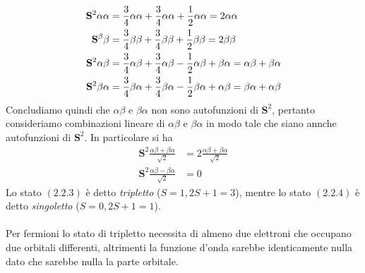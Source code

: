 \documentclass{article}
\begin{document}
\begin{align}
    \mathbf{S}^2\alpha\alpha &= \frac{3}{4}\alpha\alpha + \frac{3}{4}\alpha\alpha + \frac{1}{2}\alpha\alpha = 2\alpha\alpha \notag \\
    \mathbf{S}^\beta\beta &= \frac{3}{4}\beta\beta + \frac{3}{4}\beta\beta + \frac{1}{2}\beta\beta = 2\beta\beta \notag \\
    \mathbf{S}^2\alpha\beta &= \frac{3}{4}\alpha\beta + \frac{3}{4}\alpha\beta - \frac{1}{2}\alpha\beta + \beta\alpha = \alpha\beta + \beta\alpha \notag \\
    \mathbf{S}^2\beta\alpha &= \frac{3}{4}\beta\alpha + \frac{3}{4}\beta\alpha - \frac{1}{2}\beta\alpha + \alpha\beta = \beta\alpha + \alpha\beta \notag
\end{align}
Concludiamo quindi che $\alpha\beta$ e $\beta\alpha$ non sono autofunzioni di $\mathbf{S}^2$, pertanto consideriamo combinazioni lineare di $\alpha\beta$ e $\beta\alpha$ in modo tale che siano annche autofunzioni di $\mathbf{S}^2$. In particolare si ha 
\begin{align}
    \mathbf{S}^2\frac{\alpha\beta + \beta\alpha}{\sqrt{2}} &= 2\frac{\alpha\beta + \beta\alpha}{\sqrt{2}} \tag{2.2.3} \\
    \mathbf{S}^2\frac{\alpha\beta - \beta\alpha}{\sqrt{2}} &= 0 \tag{2.2.4}
\end{align}
Lo stato $(2.2.3)$ è detto \textit{tripletto} ($S = 1, 2S + 1 = 3$), mentre lo stato $(2.2.4)$ è detto \textit{singoletto} ($S = 0, 2S + 1 = 1$). \\ \\
Per fermioni lo stato di tripletto necessita di almeno due elettroni che occupano due orbitali differenti, altrimenti la funzione d'onda sarebbe identicamente nulla dato che sarebbe nulla la parte orbitale.

\newpage
\end{document}
